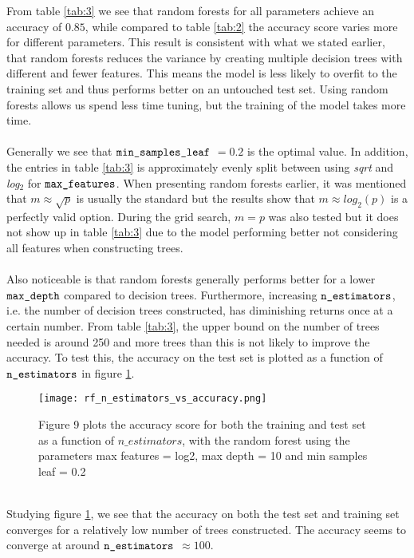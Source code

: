 \documentclass[a4paper,twocolumn]{article}
\begin{document}
From table \ref{tab:3} we see that random forests for all parameters achieve an accuracy of $0.85$, while compared to table \ref{tab:2} the accuracy score varies more for different parameters. This result is consistent with what we stated earlier, that random forests reduces the variance by creating multiple decision trees with different and fewer features. This means the model is less likely to overfit to the training set and thus performs better on an untouched test set. Using random forests allows us spend less time tuning, but the training of the model takes more time.\\
\\
Generally we see that $\verb"min_samples_leaf"$ $= 0.2$ is the optimal value. In addition, the entries in table \ref{tab:3} is approximately evenly split between using \textit{sqrt} and \textit{log}$_{2}$ for $\verb"max_features"$. When presenting random forests earlier, it was mentioned that $m \approx \sqrt{p}$ is usually the standard but the results show that $m \approx log_{2}(p)$ is a perfectly valid option. During the grid search, $m = p$ was also tested but it does not show up in table \ref{tab:3} due to the model performing better not considering all features when constructing trees. \\
\\
Also noticeable is that random forests generally performs better for a lower $\verb"max_depth"$ compared to decision trees. Furthermore, increasing $\verb"n_estimators"$, i.e. the number of decision trees constructed, has diminishing returns once at a certain number. From table \ref{tab:3}, the  upper bound on the number of trees needed is around 250 and more trees than this is not likely to improve the accuracy. To test this, the accuracy on the test set is plotted as a function of $\verb"n_estimators"$ in figure \ref{fig:9}.
\begin{figure}[ht]
    \centering
    \texttt{[image: rf\_n\_estimators\_vs\_accuracy.png]}
    \caption{Figure 9 plots the accuracy score for both the training and test set as a function of $n\_estimators$, with the random forest using the parameters max features = log2, max depth = 10 and min samples leaf = 0.2}
    \label{fig:9}
\end{figure}\\
Studying figure \ref{fig:9}, we see that the accuracy on both the test set and training set converges for a relatively low number of trees constructed. The accuracy seems to converge at around $\verb"n_estimators"$ $\approx 100$.
\end{document}
